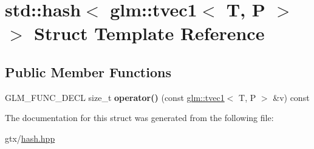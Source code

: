 \hypertarget{structstd_1_1hash_3_01glm_1_1tvec1_3_01T_00_01P_01_4_01_4}{\section{std\-:\-:hash$<$ glm\-:\-:tvec1$<$ T, P $>$ $>$ Struct Template Reference}
\label{structstd_1_1hash_3_01glm_1_1tvec1_3_01T_00_01P_01_4_01_4}
}
\subsection*{Public Member Functions}
\begin{DoxyCompactItemize}
\item 
\hypertarget{structstd_1_1hash_3_01glm_1_1tvec1_3_01T_00_01P_01_4_01_4_acc0e26ed9c9f53867b92e9610f5664eb}{G\-L\-M\-\_\-\-F\-U\-N\-C\-\_\-\-D\-E\-C\-L size\-\_\-t {\bfseries operator()} (const \hyperlink{structglm_1_1tvec1}{glm\-::tvec1}$<$ T, P $>$ \&v) const }\label{structstd_1_1hash_3_01glm_1_1tvec1_3_01T_00_01P_01_4_01_4_acc0e26ed9c9f53867b92e9610f5664eb}

\end{DoxyCompactItemize}


The documentation for this struct was generated from the following file\-:\begin{DoxyCompactItemize}
\item 
gtx/\hyperlink{hash_8hpp}{hash.\-hpp}\end{DoxyCompactItemize}
